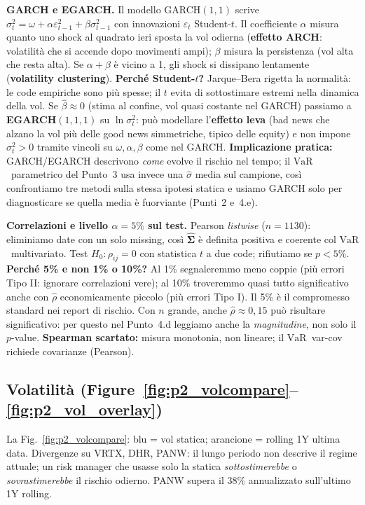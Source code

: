 \documentclass[12pt,a4paper]{article}
\newcommand{\VaR}{\ensuremath{\mathrm{VaR}}}
\begin{document}
\textbf{GARCH e EGARCH.} Il modello GARCH$(1,1)$ scrive $\sigma_t^2=\omega+\alpha\varepsilon_{t-1}^2+\beta\sigma_{t-1}^2$ con innovazioni $\varepsilon_t$ Student-$t$. Il coefficiente $\alpha$ misura quanto uno shock al quadrato ieri sposta la vol odierna (\textbf{effetto ARCH}: volatilità che si accende dopo movimenti ampi); $\beta$ misura la persistenza (vol alta che resta alta). Se $\alpha+\beta$ è vicino a 1, gli shock si dissipano lentamente (\textbf{volatility clustering}). \textbf{Perché Student-$t$?} Jarque--Bera rigetta la normalità: le code empiriche sono più spesse; il $t$ evita di sottostimare estremi nella dinamica della vol. Se $\hat\beta\approx 0$ (stima al confine, vol quasi costante nel GARCH) passiamo a \textbf{EGARCH}$(1,1,1)$ su $\ln\sigma_t^2$: può modellare l'\textbf{effetto leva} (bad news che alzano la vol più delle good news simmetriche, tipico delle equity) e non impone $\sigma_t^2>0$ tramite vincoli su $\omega,\alpha,\beta$ come nel GARCH. \textbf{Implicazione pratica:} GARCH/EGARCH descrivono \emph{come} evolve il rischio nel tempo; il \VaR\ parametrico del Punto~3 usa invece una $\hat\sigma$ media sul campione, così confrontiamo tre metodi sulla stessa ipotesi statica e usiamo GARCH solo per diagnosticare se quella media è fuorviante (Punti~2 e~4.e).

\textbf{Correlazioni e livello $\alpha=5\%$ sul test.} Pearson \emph{listwise} ($n=1130$): eliminiamo date con un solo missing, così $\hat{\boldsymbol\Sigma}$ è definita positiva e coerente col \VaR\ multivariato. Test $H_0\colon\rho_{ij}=0$ con statistica $t$ a due code; rifiutiamo se $p<5\%$. \textbf{Perché 5\% e non 1\% o 10\%?} Al 1\% segnaleremmo meno coppie (più errori Tipo II: ignorare correlazioni vere); al 10\% troveremmo quasi tutto significativo anche con $\hat\rho$ economicamente piccolo (più errori Tipo I). Il 5\% è il compromesso standard nei report di rischio. Con $n$ grande, anche $\hat\rho\approx 0{,}15$ può risultare significativo: per questo nel Punto~4.d leggiamo anche la \emph{magnitudine}, non solo il $p$-value. \textbf{Spearman scartato:} misura monotonia, non lineare; il \VaR\ var-cov richiede covarianze (Pearson).

\subsection*{Volatilità (Figure~\ref{fig:p2_volcompare}--\ref{fig:p2_vol_overlay})}

La Fig.~\ref{fig:p2_volcompare}: blu = vol statica; arancione = rolling 1Y ultima data. Divergenze su VRTX, DHR, PANW: il lungo periodo non descrive il regime attuale; un risk manager che usasse solo la statica \emph{sottostimerebbe} o \emph{sovrastimerebbe} il rischio odierno. PANW supera il $38\%$ annualizzato sull'ultimo 1Y rolling.
\end{document}
